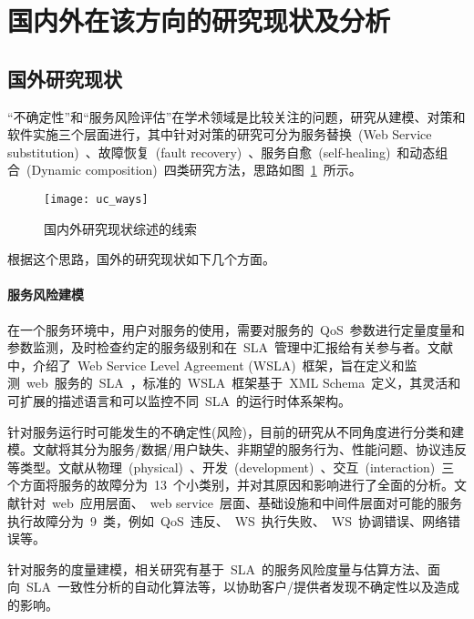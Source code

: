 \section{国内外在该方向的研究现状及分析}
\subsection{国外研究现状}

“不确定性”和“服务风险评估”在学术领域是比较关注的问题，研究从建模、对策和软件实施三个层面进行，其中针对对策的研究可分为服务替换~(Web Service substitution)~、故障恢复~(fault recovery)~、服务自愈~(self-healing)~和动态组合~(Dynamic composition)~四类研究方法，思路如图~\ref{uc_ways}~所示。

\begin{figure}[htbp]
\centering
\texttt{[image: uc\_ways]}
\caption{国内外研究现状综述的线索}\label{uc_ways}
\vspace{-1em}
\end{figure}

根据这个思路，国外的研究现状如下几个方面。

\setcounter{paragraph}{0}
\paragraph{服务风险建模}

在一个服务环境中，用户对服务的使用，需要对服务的~QoS~参数进行定量度量和参数监测，及时检查约定的服务级别和在~SLA~管理中汇报给有关参与者。文献\cite{keller2003wsla}中，介绍了~Web Service Level Agreement (WSLA)~框架，旨在定义和监测~web~服务的~SLA~，标准的~WSLA~框架基于~XML Schema~定义，其灵活和可扩展的描述语言和可以监控不同~SLA~的运行时体系架构。

针对服务运行时可能发生的不确定性(风险)，目前的研究从不同角度进行分类和建模。文献\cite{kokash2007evaluating}将其分为服务/数据/用户缺失、非期望的服务行为、性能问题、协议违反等类型。文献\cite{chan2009fault}从物理~(physical)~、开发~(development)~、交互~(interaction)~三个方面将服务的故障分为~13~个小类别，并对其原因和影响进行了全面的分析。文献\cite{ardagna2006faults}针对~web~应用层面、~web service~层面、基础设施和中间件层面对可能的服务执行故障分为~9~类，例如~QoS~违反、~WS~执行失败、~WS~协调错误、网络错误等。

针对服务的度量建模，相关研究有基于~SLA~的服务风险度量与估算方法、面向~SLA~一致性分析的自动化算法等，以协助客户/提供者发现不确定性以及造成的影响。

